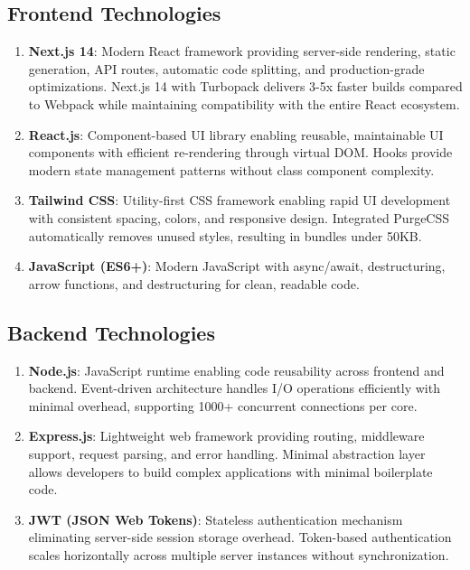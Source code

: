 \documentclass[12pt,a4paper]{report}
\begin{document}
\subsection{Frontend Technologies}
\begin{enumerate}[label=\roman*)]
    \item \textbf{Next.js 14}: Modern React framework providing server-side rendering, static generation, API routes, automatic code splitting, and production-grade optimizations. Next.js 14 with Turbopack delivers 3-5x faster builds compared to Webpack while maintaining compatibility with the entire React ecosystem.
    \item \textbf{React.js}: Component-based UI library enabling reusable, maintainable UI components with efficient re-rendering through virtual DOM. Hooks provide modern state management patterns without class component complexity.
    \item \textbf{Tailwind CSS}: Utility-first CSS framework enabling rapid UI development with consistent spacing, colors, and responsive design. Integrated PurgeCSS automatically removes unused styles, resulting in bundles under 50KB.
    \item \textbf{JavaScript (ES6+)}: Modern JavaScript with async/await, destructuring, arrow functions, and destructuring for clean, readable code.
\end{enumerate}

\subsection{Backend Technologies}
\begin{enumerate}[label=\roman*)]
    \item \textbf{Node.js}: JavaScript runtime enabling code reusability across frontend and backend. Event-driven architecture handles I/O operations efficiently with minimal overhead, supporting 1000+ concurrent connections per core.
    \item \textbf{Express.js}: Lightweight web framework providing routing, middleware support, request parsing, and error handling. Minimal abstraction layer allows developers to build complex applications with minimal boilerplate code.
    \item \textbf{JWT (JSON Web Tokens)}: Stateless authentication mechanism eliminating server-side session storage overhead. Token-based authentication scales horizontally across multiple server instances without synchronization.
\end{enumerate}
\end{document}
